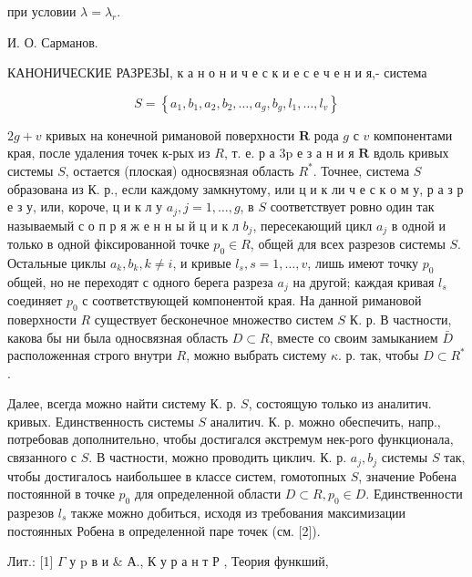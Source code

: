 \documentclass[10pt]{article}
\begin{document}
при условии $\lambda=\lambda_{r}$.



И. О. Сарманов.



КАНОНИЧЕСКИЕ РАЗРЕЗЫ, к а н о н и ч е с к и е с е ч е н и я,- система



\[

S=\left\{a_{1}, b_{1}, a_{2}, b_{2}, \ldots, a_{g}, b_{g}, l_{1}, \ldots, l_{v}\right\}

\]



$2 g+v$ кривых на конечной римановой поверхности $\boldsymbol{R}$ рода $g$ с $v$ компонентами края, после удаления точек к-рых из $R$, т. е. р а $3 \mathrm{p}$ е з а н и я $\boldsymbol{R}$ вдоль кривых системы $S$, остается (плоская) односвязная область $R^{*}$. Точнее, система $S$ образована из К. р., если каждому замкнутому, или ц и к ли ч е с к о м у, р а з р е з у, или, короче, ц и к л у $a_{j}, j=1, \ldots, g$, в $S$ соответствует ровно один так называемый с о п р я ж е н н ы й ц и к л $b_{j}$, пересекающий цикл $a_{j}$ в одной и только в одной фіксированной точке $p_{0} \in R$, общей для всех разрезов системы $S$. Остальные циклы $a_{k}, b_{k}, k \neq i$, и кривые $l_{s}, s=1, \ldots, v$, лишь имеют точку $p_{0}$ общей, но не переходят с одного берега разреза $a_{j}$ на другой; каждая кривая $l_{s}$ соединяет $p_{0}$ с соответствующей компонентой края. На данной римановой поверхности $R$ существует бесконечное множество систем $S$ К. р. В частности, какова бы ни была односвязная область $D \subset R$, вместе со своим замыканием $\bar{D}$ расположенная строго внутри $R$, можно выбрать систему $\kappa$. р. так, чтобы $D \subset R^{*}$.



Далее, всегда можно найти систему К. р. $S$, состоящую только из аналитич. кривых. Единственность системы $S$ аналитич. К. р. можно обеспечить, напр., потребовав дополнительно, чтобы достигался әкстремум нек-рого функционала, связанного с $S$. В частности, можно проводить циклич. К. р. $a_{j}, b_{j}$ системы $S$ так, чтобы достигалось наибольшее в классе систем, гомотопных $S$, значение Робена постоянной в точке $p_{0}$ для определенной области $D \subset R, p_{0} \in D$. Единственности разрезов $l_{s}$ также можно добиться, исходя из требования максимизации постоянных Робена в определенной паре точек (см. [2]).



Лит.: [1] $\Gamma$ у p в и \& А., К у р а н т Р , Теория функший,
\end{document}
